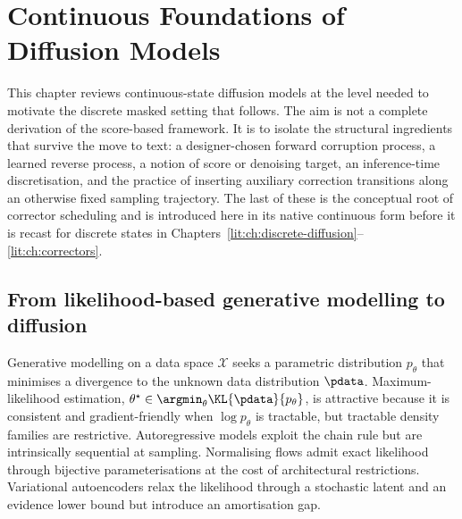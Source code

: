 

\chapter{Continuous Foundations of Diffusion Models}
\label{lit:ch:continuous-diffusion}

This chapter reviews continuous-state diffusion models at the level needed to
motivate the discrete masked setting that follows. The aim is not a complete
derivation of the score-based framework. It is to isolate the structural
ingredients that survive the move to text: a designer-chosen forward
corruption process, a learned reverse process, a notion of score or denoising
target, an inference-time discretisation, and the practice of inserting
auxiliary correction transitions along an otherwise fixed sampling
trajectory. The last of these is the conceptual root of corrector scheduling
and is introduced here in its native continuous form before it is recast for
discrete states in
Chapters~\ref{lit:ch:discrete-diffusion}--\ref{lit:ch:correctors}.

\section{From likelihood-based generative modelling to diffusion}
\label{lit:sec:gen-modeling}

Generative modelling on a data space $\mathcal{X}$ seeks a parametric
distribution $p_\theta$ that minimises a divergence to the unknown data
distribution $\pdata$. Maximum-likelihood estimation,
$\theta^\star \in \argmin_\theta \KL{\pdata}{p_\theta}$, is attractive because
it is consistent and gradient-friendly when $\log p_\theta$ is tractable, but
tractable density families are restrictive. Autoregressive models exploit the
chain rule but are intrinsically sequential at sampling. Normalising flows
admit exact likelihood through bijective parameterisations at the cost of
architectural restrictions. Variational autoencoders relax the likelihood
through a stochastic latent and an evidence lower bound but introduce an
amortisation gap.

